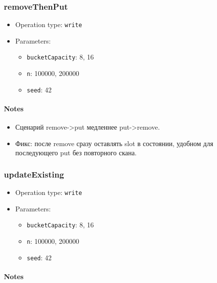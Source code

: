\documentclass[
  10pt,
]{article}
\providecommand{\tightlist}{%
  \setlength{\itemsep}{0pt}\setlength{\parskip}{0pt}}
\begin{document}
\subsubsection{removeThenPut}\label{removethenput}

\begin{itemize}
\tightlist
\item
  Operation type: \texttt{write}
\item
  Parameters:

  \begin{itemize}
  \tightlist
  \item
    \texttt{bucketCapacity}: 8, 16
  \item
    \texttt{n}: 100000, 200000
  \item
    \texttt{seed}: 42
  \end{itemize}
\end{itemize}

\paragraph{Notes}\label{notes-4}

\begin{itemize}
\tightlist
\item
  Сценарий remove-\textgreater put медленнее put-\textgreater remove.
\item
  Фикс: после remove сразу оставлять slot в состоянии, удобном для
  последующего put без повторного скана.
\end{itemize}

\subsubsection{updateExisting}\label{updateexisting}

\begin{itemize}
\tightlist
\item
  Operation type: \texttt{write}
\item
  Parameters:

  \begin{itemize}
  \tightlist
  \item
    \texttt{bucketCapacity}: 8, 16
  \item
    \texttt{n}: 100000, 200000
  \item
    \texttt{seed}: 42
  \end{itemize}
\end{itemize}

\paragraph{Notes}\label{notes-5}
\end{document}
